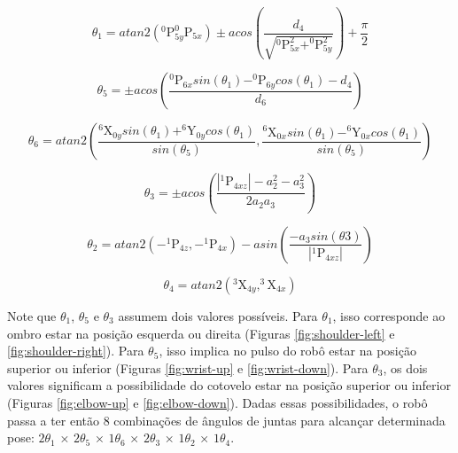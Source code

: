 \begin{equation}\label{eq:theta-1}
\theta _1=atan2\left (^{0}\textrm{P}_{5y}^{0}\textrm{P}_{5x}  \right )\pm acos\left ( \frac{d_4}{\sqrt{^{0}\textrm{P}_{5x}^{2}+^{0}\textrm{P}_{5y}^{2}}} \right )+\frac{\pi }{2}
\end{equation}

\begin{equation}\label{eq:theta-5}
\theta _5=\pm acos\left ( \frac{^{0}\textrm{P}_{6x}sin(\theta _1)-^{0}\textrm{P}_{6y}cos(\theta _1)-d_4}{d_6} \right )
\end{equation}

\begin{equation}\label{eq:theta-6}
\theta _6=atan2\left ( \frac{^{6}\textrm{X}_{0y}sin(\theta_1)+^{6}\textrm{Y}_{0y}cos(\theta_1)}{sin(\theta_5)}, \frac{^{6}\textrm{X}_{0x}sin(\theta_1)-^{6}\textrm{Y}_{0x}cos(\theta_1)}{sin(\theta_5)} \right )
\end{equation}

\begin{equation}\label{eq:theta-3}
\theta _3 = \pm acos\left ( \frac{\left |^{1}\textrm{P}_{4xz}  \right |-a_2^2-a_3^2}{2a_2a_3} \right )
\end{equation}

\begin{equation}\label{eq:theta-2}
\theta _2 = atan2\left (-^{1}\textrm{P}_{4z},-^{1}\textrm{P}_{4x}  \right )-asin\left ( \frac{-a_3sin(\theta3)}{\left |^{1}\textrm{P}_{4xz}  \right |} \right )
\end{equation}

\begin{equation}\label{eq:theta-4}
\theta _4 = atan2 \left ( ^{3}\textrm{X}_{4y},^{3}\textrm{X}_{4x} \right )
\end{equation}

Note que $\theta_{1}$, $\theta_{5}$ e $\theta_{3}$ assumem dois valores possíveis. Para $\theta_{1}$,
isso corresponde ao ombro estar na posição esquerda ou direita (Figuras \ref{fig:shoulder-left} e 
\ref{fig:shoulder-right}). Para $\theta_{5}$, isso implica no pulso do robô estar na posição superior
ou inferior (Figuras \ref{fig:wrist-up} e \ref{fig:wrist-down}). Para $\theta_{3}$, os dois valores
significam a possibilidade do cotovelo estar na posição superior ou inferior (Figuras \ref{fig:elbow-up}
e \ref{fig:elbow-down}). Dadas essas possibilidades, o robô passa a ter então 8 combinações de ângulos de
juntas para alcançar determinada pose: $2\theta_{1}$ × $2\theta_{5}$ × $1\theta_{6}$ × $2\theta_{3}$ × $1\theta_{2}$ × $1\theta_{4}$.

